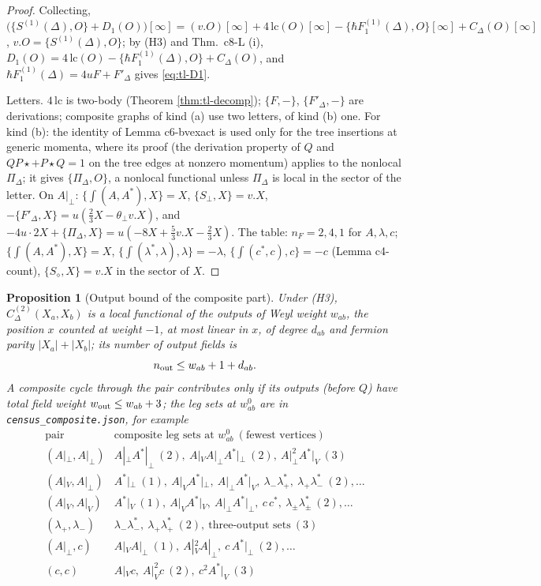 \documentclass[11pt]{article}
\numberwithin{equation}{section}
\theoremstyle{plain}
\newtheorem{proposition}[theorem]{Proposition}
\theoremstyle{definition}
\begin{document}
\begin{proof}
Collecting, $\big(\{S^{(1)}(\Delta),O\}+D_1(O)\big)[\infty]=(v.O)[\infty]+4\,\mathrm{lc}(O)[\infty]-\{\hbar F_1^{(1)}(\Delta),O\}[\infty]+C_\Delta(O)[\infty]$, $v.O=\{S^{(1)}(\Delta),O\}$; by (H3) and Thm.~c8-L (i), $D_1(O)=4\,\mathrm{lc}(O)-\{\hbar F_1^{(1)}(\Delta),O\}+C_\Delta(O)$, and $\hbar F_1^{(1)}(\Delta)=4uF+F'_\Delta$ gives \eqref{eq:tl-D1}.

Letters. $4\,\mathrm{lc}$ is two-body (Theorem \ref{thm:tl-decomp}); $\{F,-\}$, $\{F'_\Delta,-\}$ are derivations; composite graphs of kind (a) use two letters, of kind (b) one. For kind (b): the identity of Lemma c6-bvexact is used only for the tree insertions at generic momenta, where its proof (the derivation property of $Q$ and $QP\star+P\star Q=1$ on the tree edges at nonzero momentum) applies to the nonlocal $\Pi_\Delta$; it gives $\{\Pi_\Delta,O\}$, a nonlocal functional unless $\Pi_\Delta$ is local in the sector of the letter. On $A|_\perp$: $\{\int(A,A^*),X\}=X$, $\{S_\perp,X\}=v.X$, $-\{F'_\Delta,X\}=u(\tfrac23X-\theta_\perp v.X)$, and $-4u\cdot2X+\{\Pi_\Delta,X\}=u(-8X+\tfrac53v.X-\tfrac23X)$. The table: $n_F=2,4,1$ for $A,\lambda,c$; $\{\int(A,A^*),X\}=X$, $\{\int(\lambda^*,\lambda),\lambda\}=-\lambda$, $\{\int(c^*,c),c\}=-c$ (Lemma c4-count), $\{S_\diamond,X\}=v.X$ in the sector of $X$.
\end{proof}

\begin{proposition}[Output bound of the composite part]
\label{prop:tl-compbound}
Under (H3), $C^{(2)}_\Delta(X_a,X_b)$ is a local functional of the outputs of Weyl weight $w_{ab}$, the position $x$ counted at weight $-1$, at most linear in $x$, of degree $d_{ab}$ and fermion parity $|X_a|+|X_b|$; its number of output fields is
\[
n_{\rm out}\le w_{ab}+1+d_{ab}.
\]
A composite cycle through the pair contributes only if its outputs (before $Q$) have total field weight $w_{\rm out}\le w_{ab}+3$; the leg sets at $w^0_{ab}$ are in \texttt{census\_composite.json}, for example
\[
\begin{array}{l|l}
\text{pair} & \text{composite leg sets at }w^0_{ab}\ (\text{fewest vertices})\\\hline
(A|_\perp,A|_\perp) & A|_\perp A^*|_\perp\ (2),\ A|_VA|_\perp A^*|_\perp\ (2),\ A|_\perp^2A^*|_V\ (3)\\
(A|_V,A|_\perp) & A^*|_\perp\ (1),\ A|_VA^*|_\perp,\ A|_\perp A^*|_V,\ \lambda_-\lambda^*_+,\ \lambda_+\lambda^*_-\ (2),\dots\\
(A|_V,A|_V) & A^*|_V\ (1),\ A|_VA^*|_V,\ A|_\perp A^*|_\perp,\ c\,c^*,\ \lambda_\pm\lambda^*_\pm\ (2),\dots\\
(\lambda_+,\lambda_-) & \lambda_-\lambda^*_-,\ \lambda_+\lambda^*_+\ (2),\ \text{three-output sets}\ (3)\\
(A|_\perp,c) & A|_VA|_\perp\ (1),\ A|_V^2A|_\perp,\ c\,A^*|_\perp\ (2),\dots\\
(c,c) & A|_Vc,\ A|_V^2c\ (2),\ c^2A^*|_V\ (3)
\end{array}
\]
\end{proposition}
\end{document}
